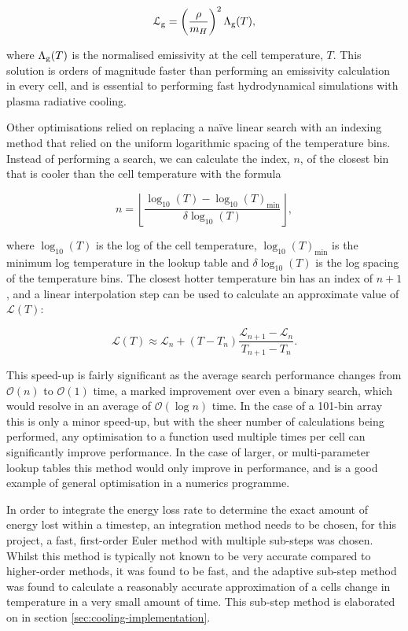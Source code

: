 \begin{equation}
  \mathcal{L}_\text{g} = \left(\frac{\rho}{m_H}\right)^2 \Lambda_\text{g} (T) ,
\end{equation}

\noindent
where $\Lambda_\text{g}(T)$ is the normalised emissivity at the cell temperature, $T$.
This solution is orders of magnitude faster than performing an emissivity calculation in every cell, and is essential to performing fast hydrodynamical simulations with plasma radiative cooling.

Other optimisations relied on replacing a na\"ive linear search with an indexing method that relied on the uniform logarithmic spacing of the temperature bins.
Instead of performing a search, we can calculate the index, $n$, of the closest bin that is cooler than the cell temperature with the formula

\begin{equation}
    n = \left \lfloor \frac{\log_{10}(T) - \log_{10}(T)_\text{min}}{\delta \log_{10} (T)} \right \rfloor ,
\end{equation}

\noindent
where $\log_{10}(T)$ is the log of the cell temperature, $\log_{10} (T)_\text{min}$ is the minimum log temperature in the lookup table and $\delta \log_{10} (T)$ is the log spacing of the temperature bins.
The closest hotter temperature bin has an index of $n+1$, and a linear interpolation step can be used to calculate an approximate value of $\mathcal{L}(T)$:

\begin{equation}
  \mathcal{L}(T) \approx \mathcal{L}_n + (T - T_n) \frac{\mathcal{L}_{n+1} - \mathcal{L}_n}{T_{n+1} - T_n} .
\end{equation}

This speed-up is fairly significant as the average search performance changes from $\mathcal{O}(n)$ to $\mathcal{O}(1)$ time, a marked improvement over even a binary search, which would resolve in an average of $\mathcal{O}(\log n)$ time.
In the case of a 101-bin array this is only a minor speed-up, but with the sheer number of calculations being performed, any optimisation to a function used multiple times per cell can significantly improve performance.
In the case of larger, or multi-parameter lookup tables this method would only improve in performance, and is a good example of general optimisation in a numerics programme.

In order to integrate the energy loss rate to determine the exact amount of energy lost within a timestep, an integration method needs to be chosen, for this project, a fast, first-order Euler method with multiple sub-steps was chosen.
Whilst this method is typically not known to be very accurate compared to higher-order methods, it was found to be fast, and the adaptive sub-step method was found to calculate a reasonably accurate approximation of a cells change in temperature in a very small amount of time.
This sub-step method is elaborated on in section \ref{sec:cooling-implementation}.

